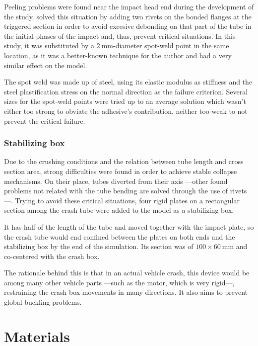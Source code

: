 \documentclass[cmfonts]{witpress}
\begin{document}
Peeling problems were found near the impact head end during the development of the study. \cite{Peroni2009} solved this situation by adding two rivets on the bonded flanges at the triggered section in order to avoid excesive debonding on that part of the tube in the initial phases of the impact and, thus, prevent critical situations. In this study, it was substituted by a $\SI{2}{\mm}$-diameter spot-weld point in the same location, as it was a better-known technique for the author and had a very similar effect on the model.


The spot weld was made up of steel, using its elastic modulus as stiffness and the steel plastification stress on the normal direction as the failure criterion. Several sizes for the spot-weld points were tried up to an average solution which wasn't either too strong to obviate the adhesive's contribution, neither too weak to not prevent the critical failure.

\subsubsection{Stabilizing box}

Due to the crushing conditions and the relation between tube length and cross section area, strong difficulties were found in order to achieve stable collapse mechanisms. On their place, tubes diverted from their axis ---other found problems not related with the tube bending are solved through the use of rivets---. Trying to avoid these critical situations, four rigid plates on a rectangular section among the crash tube were added to the model as a stabilizing box.

It has half of the length of the tube and moved together with the impact plate, so the crash tube would end confined between the plates on both ends and the stabilizing box by the end of the simulation. Its section was of $\num{100}\times\SI{60}{\mm}$ and co-centered with the crash box.

The rationale behind this is that in an actual vehicle crash, this device would be among many other vehicle parts ---such as the motor, which is very rigid---, restraining the crash box movements in many directions. It also aims to prevent global buckling problems.

\section{Materials}
\end{document}
